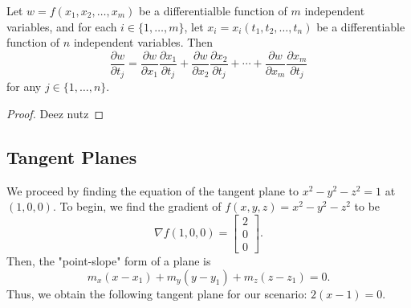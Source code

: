 \documentclass[12pt]{scrartcl}
\begin{document}
%
%    
\begin{theorem}
    Let $w = f(x_1, x_2, \dots, x_m)$ be a differentialble function of $m$
    independent variables, and for each $i \in \{1,\dots,m\}$, let
    $x_i = x_i(t_1,t_2,\dots,t_n)$ be a differentiable function of $n$
    independent variables. Then
    $$\dfrac{\partial w}{\partial t_j} = \dfrac{\partial w}{\partial x_1}
    \dfrac{\partial x_1}{\partial t_j}+
    \dfrac{\partial w}{\partial x_2}\dfrac{\partial x_2}{\partial t_j}+\cdots
    +\dfrac{\partial w}{\partial x_m}\dfrac{\partial x_m}{\partial t_j}$$
    for any $j\in \{1,\dots,n\}$.
\end{theorem}
\begin{proof}
   Deez nutz 
\end{proof}

\subsection{Tangent Planes}
We proceed by finding the equation of the tangent plane to $x^2-y^2-z^2=1$ at
$(1,0,0)$. To begin, we find the gradient of $f(x,y,z)=x^2-y^2-z^2$ to be
$$\nabla f(1,0,0) = \begin{bmatrix} 2 \\ 0 \\ 0 \end{bmatrix}.$$ Then, the "point-slope"
form of a plane is $$m_x(x-x_1)+m_y(y-y_1)+m_z(z-z_1)=0.$$ Thus, we obtain
the following tangent plane for our scenario: $2(x-1)=0$.
\end{document}
